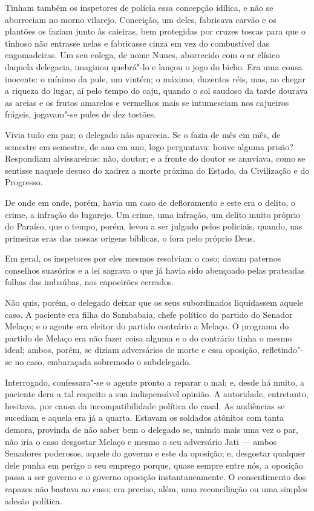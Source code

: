 Tinham também os inspetores de polícia essa concepção idílica, e não se
aborreciam no morno vilarejo. Conceição, um deles, fabricava carvão e os
plantões os faziam junto às caieiras, bem protegidas por cruzes toscas
para que o tinhoso não entrasse nelas e fabricasse cinza em vez do
combustível das engomadeiras. Um seu colega, de nome Nunes, aborrecido
com o ar elísico daquela delegacia, imaginou quebrá"-lo e lançou o jogo
do bicho. Era uma cousa inocente: o mínimo da pule, um vintém; o máximo,
duzentos réis, mas, ao chegar a riqueza do lugar, aí pelo tempo do caju,
quando o sol saudoso da tarde dourava as areias e os frutos amarelos e
vermelhos mais se intumesciam nos cajueiros frágeis, jogavam"-se pules de
dez tostões.

Vivia tudo em paz; o delegado não aparecia. Se o fazia de mês em mês, de
semestre em semestre, de ano em ano, logo perguntava: houve alguma
prisão? Respondiam alvissareiros: não, doutor; e a fronte do doutor se
anuviava, como se sentisse naquele desuso do xadrez a morte próxima do
Estado, da Civilização e do Progresso.

De onde em onde, porém, havia um caso de defloramento e este era o
delito, o crime, a infração do lugarejo. Um crime, uma infração, um
delito muito próprio do Paraíso, que o tempo, porém, levou a ser julgado
pelos policiais, quando, nas primeiras eras das nossas origens bíblicas,
o fora pelo próprio Deus.

Em geral, os inspetores por eles mesmos resolviam o caso; davam paternos
conselhos suasórios e a lei sagrava o que já havia sido abençoado pelas
prateadas folhas das imbaúbas, nos capoeirões cerrados.

Não quis, porém, o delegado deixar que os seus subordinados liquidassem
aquele caso. A paciente era filha do Sambabaia, chefe político do
partido do Senador Melaço; e o agente era eleitor do partido contrário a
Melaço. O programa do partido de Melaço era não fazer coisa alguma e o
do contrário tinha o mesmo ideal; ambos, porém, se diziam adversários de
morte e essa oposição, refletindo"-se no caso, embaraçada sobremodo o
subdelegado.

Interrogado, confessara"-se o agente pronto a reparar o mal; e, desde há
muito, a paciente dera a tal respeito a sua indispensável opinião. A
autoridade, entretanto, hesitava, por causa da incompatibilidade
política do casal. As audiências se sucediam e aquela era já a quarta.
Estavam os soldados atônitos com tanta demora, provinda de não saber bem
o delegado se, unindo mais uma vez o par, não iria o caso desgostar
Melaço e mesmo o seu adversário Jati --- ambos Senadores poderosos,
aquele do governo e este da oposição; e, desgostar qualquer dele punha
em perigo o seu emprego porque, quase sempre entre nós, a oposição passa
a ser governo e o governo oposição instantaneamente. O consentimento dos
rapazes não bastava ao caso; era preciso, além, uma reconciliação ou uma
simples adesão política.


